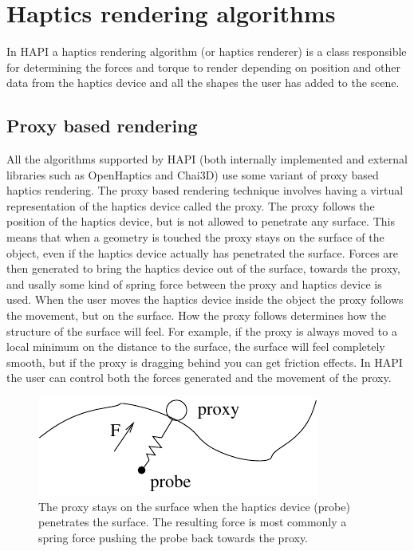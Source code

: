 
\chapter {Haptics rendering algorithms}
In HAPI a haptics rendering algorithm (or haptics renderer) is a class
responsible for determining the forces and torque to render depending
on position and other data from the haptics device and all the shapes
the user has added to the scene. 

\section{Proxy based rendering}
All the algorithms supported by HAPI (both internally implemented and
external libraries such as OpenHaptics and Chai3D) use some variant of
proxy based haptics rendering. The proxy based rendering technique
involves having a virtual representation of the haptics device called
the proxy. The proxy follows the position of the haptics device, but
is not allowed to penetrate any surface. This means that when a
geometry is touched the proxy stays on the surface of the object, even
if the haptics device actually has penetrated the surface. Forces are
then generated to bring the haptics device out of the surface, towards
the proxy, and usally some kind of spring force between the proxy and
haptics device is used. When the user moves the haptics device inside
the object the proxy follows the movement, but on the surface. How the
proxy follows determines how the structure of the surface will
feel. For example, if the proxy is always moved to a local minimum on
the distance to the surface, the surface will feel completely smooth,
but if the proxy is dragging behind you can get friction effects. In
HAPI the user can control both the forces generated and the movement
of the proxy.

\begin{figure} 
  \centering 
  \includegraphics{images/proxyfinger.pdf}
  \caption{The proxy stays on the surface when the haptics
  device (probe) penetrates the surface. The resulting force is most
  commonly a spring force pushing the probe back towards the proxy.} 
  \label{Proxy-probe} 
\end{figure}



